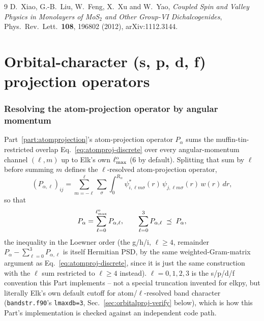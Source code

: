 \documentclass[11pt]{article}
\begin{document}
\begin{thebibliography}{9}
D.~Xiao, G.-B.~Liu, W.~Feng, X.~Xu and W.~Yao,
\emph{Coupled Spin and Valley Physics in Monolayers of MoS$_2$ and Other Group-VI
Dichalcogenides},
Phys.\ Rev.\ Lett.\ \textbf{108}, 196802 (2012), arXiv:1112.3144.
\end{thebibliography}

\part{Orbital-character (s, p, d, f) projection operators}
\label{part:orbitalprojection}

\section{Resolving the atom-projection operator by angular momentum}

Part~\ref{part:atomprojection}'s atom-projection operator $P_\alpha$ sums the
muffin-tin-restricted overlap Eq.~\eqref{eq:atomproj-discrete} over every angular-momentum
channel $(\ell,m)$ up to Elk's own $\ell_{\rm max}^{\rm o}$ (6 by default). Splitting that
sum by $\ell$ before summing $m$ defines the $\ell$-resolved atom-projection operator,
\begin{equation}
  (P_{\alpha,\ell})_{ij} = \sum_{m=-\ell}^{\ell}\sum_\sigma\int_0^{R_\alpha}
    \psi_{i,\ell m\sigma}^*(r)\,\psi_{j,\ell m\sigma}(r)\,w(r)\,dr,
  \label{eq:orbitalproj}
\end{equation}
so that
\begin{equation}
  P_\alpha = \sum_{\ell=0}^{\ell_{\rm max}^{\rm o}} P_{\alpha,\ell},
  \qquad
  \sum_{\ell=0}^{3} P_{\alpha,\ell} \;\preceq\; P_\alpha,
  \label{eq:orbitalproj-sum}
\end{equation}
the inequality in the Loewner order (the g/h/i, $\ell\ge4$, remainder $P_\alpha -
\sum_{\ell=0}^3 P_{\alpha,\ell}$ is itself Hermitian PSD, by the same weighted-Gram-matrix
argument as Eq.~\eqref{eq:atomproj-discrete}, since it is just the same construction with
the $\ell$ sum restricted to $\ell\ge4$ instead). $\ell=0,1,2,3$ is the s/p/d/f
convention this Part implements -- not a special truncation invented for elkpy, but
literally Elk's own default cutoff for atom/$\ell$-resolved band character
(\texttt{bandstr.f90}'s \texttt{lmaxdb=3}, Sec.~\ref{sec:orbitalproj-verify} below), which
is how this Part's implementation is checked against an independent code path.
\end{document}
